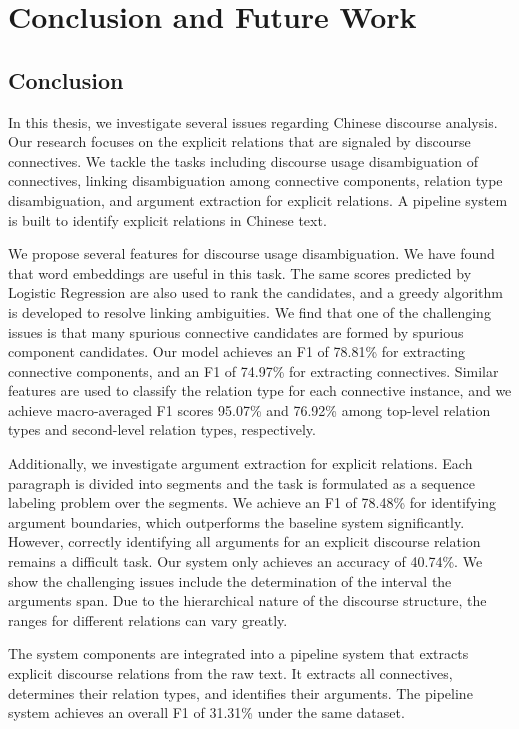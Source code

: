 %
%
%
\chapter{Conclusion and Future Work}
\label{c:future}

\section{Conclusion}

In this thesis, we investigate several issues
regarding Chinese discourse analysis. Our
research focuses on the explicit relations that
are signaled by discourse connectives.
We tackle the tasks including discourse
usage disambiguation of connectives,
linking disambiguation among connective components,
relation type disambiguation, and argument
extraction for explicit relations. A pipeline
system is built to identify explicit relations
in Chinese text.

We propose several features
for discourse usage disambiguation.
We have found that word embeddings are useful in this
task. The same scores predicted by Logistic Regression
are also used to rank the candidates, and 
a greedy algorithm is developed to resolve linking
ambiguities. We find that one of the challenging issues
is that many spurious connective candidates are formed by 
spurious component candidates. Our model achieves
an F1 of 78.81\% for extracting connective components,
and an F1 of 74.97\% for extracting connectives. Similar
features are used to classify the relation type for each
connective instance, and we achieve macro-averaged F1 scores
95.07\% and 76.92\% among top-level relation types and
second-level relation types, respectively.

Additionally, we investigate argument extraction for
explicit relations. Each paragraph is divided into segments
and the task is formulated as a sequence labeling problem
over the segments.
We achieve an F1 of 78.48\% for identifying
argument boundaries, which outperforms the baseline system
significantly. However, correctly identifying all arguments
for an explicit discourse relation remains a difficult task. Our
system only achieves an accuracy of 40.74\%. We show
the challenging issues include the determination of
the interval the arguments span. Due to the hierarchical
nature of the discourse structure, the ranges for
different relations can vary greatly.

The system components are integrated into a pipeline
system that extracts explicit discourse relations from the raw text.
It extracts all connectives, determines their relation types,
and identifies their arguments.
The pipeline system achieves an overall F1 of 31.31\% under
the same dataset.

